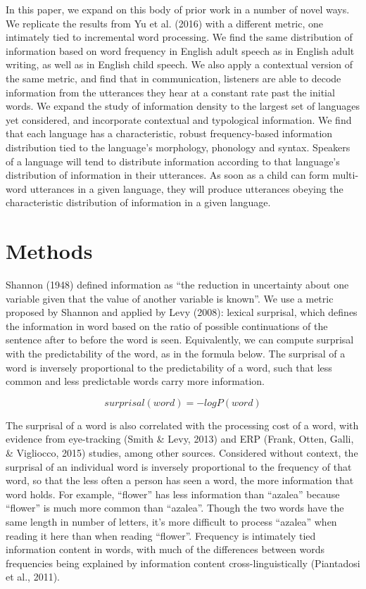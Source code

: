 \documentclass[man,floatsintext]{apa6}
\begin{document}
In this paper, we expand on this body of prior work in a number of novel ways. We replicate the results from Yu et al. (2016) with a different metric, one intimately tied to incremental word processing. We find the same distribution of information based on word frequency in English adult speech as in English adult writing, as well as in English child speech. We also apply a contextual version of the same metric, and find that in communication, listeners are able to decode information from the utterances they hear at a constant rate past the initial words. We expand the study of information density to the largest set of languages yet considered, and incorporate contextual and typological information. We find that each language has a characteristic, robust frequency-based information distribution tied to the language's morphology, phonology and syntax. Speakers of a language will tend to distribute information according to that language's distribution of information in their utterances. As soon as a child can form multi-word utterances in a given language, they will produce utterances obeying the characteristic distribution of information in a given language.

\hypertarget{methods}{%
\section{Methods}\label{methods}}

Shannon (1948) defined information as \enquote{the reduction in uncertainty about one variable given that the value of another variable is known}. We use a metric proposed by Shannon and applied by Levy (2008): lexical surprisal, which defines the information in word based on the ratio of possible continuations of the sentence after to before the word is seen. Equivalently, we can compute surprisal with the predictability of the word, as in the formula below. The surprisal of a word is inversely proportional to the predictability of a word, such that less common and less predictable words carry more information.

\[surprisal(word) = -log P(word)\]

The surprisal of a word is also correlated with the processing cost of a word, with evidence from eye-tracking (Smith \& Levy, 2013) and ERP (Frank, Otten, Galli, \& Vigliocco, 2015) studies, among other sources. Considered without context, the surprisal of an individual word is inversely proportional to the frequency of that word, so that the less often a person has seen a word, the more information that word holds. For example, \enquote{flower} has less information than \enquote{azalea} because \enquote{flower} is much more common than \enquote{azalea}. Though the two words have the same length in number of letters, it's more difficult to process \enquote{azalea} when reading it here than when reading \enquote{flower}. Frequency is intimately tied information content in words, with much of the differences between words frequencies being explained by information content cross-linguistically (Piantadosi et al., 2011).
\end{document}
